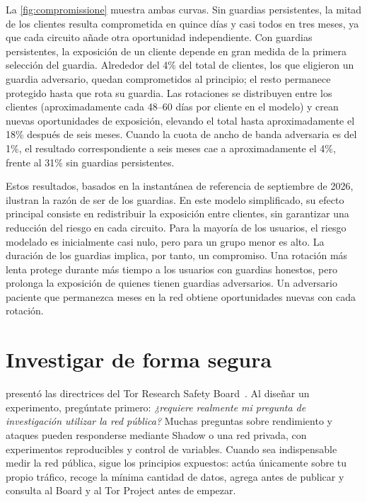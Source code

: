 La \cref{fig:compromissione} muestra ambas curvas. Sin guardias persistentes, la mitad de los clientes resulta comprometida en quince días y casi todos en tres meses, ya que cada circuito añade otra oportunidad independiente. Con guardias persistentes, la exposición de un cliente depende en gran medida de la primera selección del guardia. Alrededor del 4\% del total de clientes, los que eligieron un guardia adversario, quedan comprometidos al principio; el resto permanece protegido hasta que rota su guardia. Las rotaciones se distribuyen entre los clientes (aproximadamente cada 48--60 días por cliente en el modelo) y crean nuevas oportunidades de exposición, elevando el total hasta aproximadamente el 18\% después de seis meses. Cuando la cuota de ancho de banda adversaria es del 1\%, el resultado correspondiente a seis meses cae a aproximadamente el 4\%, frente al 31\% sin guardias persistentes.

Estos resultados, basados en la instantánea de referencia de septiembre de 2026, ilustran la razón de ser de los guardias. En este modelo simplificado, su efecto principal consiste en redistribuir la exposición entre clientes, sin garantizar una reducción del riesgo en cada circuito. Para la mayoría de los usuarios, el riesgo modelado es inicialmente casi nulo, pero para un grupo menor es alto. La duración de los guardias implica, por tanto, un compromiso. Una rotación más lenta protege durante más tiempo a los usuarios con guardias honestos, pero prolonga la exposición de quienes tienen guardias adversarios. Un adversario paciente que permanezca meses en la red obtiene oportunidades nuevas con cada rotación.

\section{Investigar de forma segura}\label{sec:ric-sicurezza}

 presentó las directrices del Tor Research Safety Board~\cite{trsb}. Al diseñar un experimento, pregúntate primero: \emph{¿requiere realmente mi pregunta de investigación utilizar la red pública?} Muchas preguntas sobre rendimiento y ataques pueden responderse mediante Shadow o una red privada, con experimentos reproducibles y control de variables. Cuando sea indispensable medir la red pública, sigue los principios expuestos: actúa únicamente sobre tu propio tráfico, recoge la mínima cantidad de datos, agrega antes de publicar y consulta al Board y al Tor Project antes de empezar.

